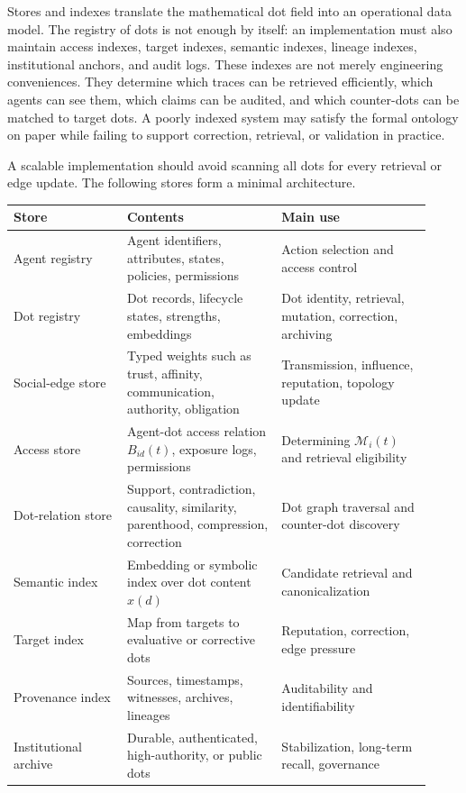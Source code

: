 \documentclass[11pt]{article}
\theoremstyle{remark}
\begin{document}
Stores and indexes translate the mathematical dot field into an operational data model. The registry of dots is not enough by itself: an implementation must also maintain access indexes, target indexes, semantic indexes, lineage indexes, institutional anchors, and audit logs. These indexes are not merely engineering conveniences. They determine which traces can be retrieved efficiently, which agents can see them, which claims can be audited, and which counter-dots can be matched to target dots. A poorly indexed system may satisfy the formal ontology on paper while failing to support correction, retrieval, or validation in practice.


A scalable implementation should avoid scanning all dots for every
retrieval or edge update. The following stores form a minimal
architecture.

\begin{longtable}[]{@{}L{0.25\linewidth}L{0.34\linewidth}L{0.33\linewidth}@{}}
\toprule
\textbf{Store} & \textbf{Contents} & \textbf{Main use} \\
\midrule
\endhead
\bottomrule
\endlastfoot
Agent registry & Agent identifiers, attributes, states, policies, permissions & Action selection and access control \\
Dot registry & Dot records, lifecycle states, strengths, embeddings & Dot identity, retrieval, mutation, correction, archiving \\
Social-edge store & Typed weights such as trust, affinity, communication, authority, obligation & Transmission, influence, reputation, topology update \\
Access store & Agent-dot access relation $B_{id}(t)$, exposure logs, permissions & Determining $\mathcal M_i(t)$ and retrieval eligibility \\
Dot-relation store & Support, contradiction, causality, similarity, parenthood, compression, correction & Dot graph traversal and counter-dot discovery \\
Semantic index & Embedding or symbolic index over dot content $x(d)$ & Candidate retrieval and canonicalization \\
Target index & Map from targets to evaluative or corrective dots & Reputation, correction, edge pressure \\
Provenance index & Sources, timestamps, witnesses, archives, lineages & Auditability and identifiability \\
Institutional archive & Durable, authenticated, high-authority, or public dots & Stabilization, long-term recall, governance \\
\end{longtable}
\end{document}
